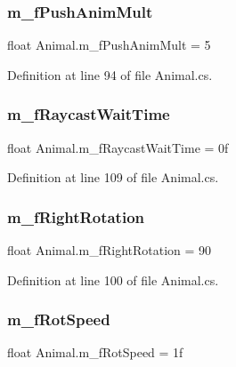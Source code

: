 \subsubsection{\texorpdfstring{m\+\_\+f\+Push\+Anim\+Mult}{m\_fPushAnimMult}}
{\footnotesize\ttfamily float Animal.\+m\+\_\+f\+Push\+Anim\+Mult = 5}



Definition at line 94 of file Animal.\+cs.

\mbox{\label{class_animal_af615d2651b634514c081cdf5e8d0f5ed}} 
\subsubsection{\texorpdfstring{m\+\_\+f\+Raycast\+Wait\+Time}{m\_fRaycastWaitTime}}
{\footnotesize\ttfamily float Animal.\+m\+\_\+f\+Raycast\+Wait\+Time = 0f}



Definition at line 109 of file Animal.\+cs.

\mbox{\label{class_animal_afe3df93e1c665aeb4232690655e81c34}} 
\subsubsection{\texorpdfstring{m\+\_\+f\+Right\+Rotation}{m\_fRightRotation}}
{\footnotesize\ttfamily float Animal.\+m\+\_\+f\+Right\+Rotation = 90}



Definition at line 100 of file Animal.\+cs.

\mbox{\label{class_animal_a2b708fd867ff4c7f87c2b38f3391f4ee}} 
\subsubsection{\texorpdfstring{m\+\_\+f\+Rot\+Speed}{m\_fRotSpeed}}
{\footnotesize\ttfamily float Animal.\+m\+\_\+f\+Rot\+Speed = 1f}



